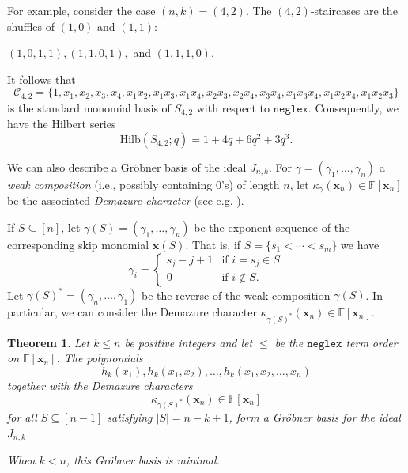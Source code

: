 \documentclass[10pt]{amsart}
\newtheorem{theorem}{Theorem}[section]
\theoremstyle{definition}
\newcommand{\Hilb}{{\mathrm {Hilb}}}
\newcommand{\neglex}{{\mathtt {neglex}}}
\newcommand{\FF}{{\mathbb{F}}}
\newcommand{\CCC}{{\mathcal{C}}}
\newcommand{\xx}{{\mathbf {x}}}
\begin{document}
For example, consider the case $(n,k) = (4,2)$.  The $(4,2)$-staircases are the shuffles of $(1,0)$ and $(1,1)$:
\begin{center}
$(1,0,1,1), (1,1,0,1),$ and $(1,1,1,0)$.
\end{center}
It follows that 
\begin{equation*}
\CCC_{4,2} = \{1, x_1, x_2, x_3, x_4, x_1 x_2, x_1 x_3, x_1 x_4, x_2 x_3, x_2 x_4, x_3 x_4, x_1 x_3 x_4, 
x_1 x_2 x_4, x_1 x_2 x_3 \}
\end{equation*}
is the standard monomial basis of $S_{4,2}$ with respect to $\neglex$.  Consequently, we have the Hilbert series
\begin{equation*}
\Hilb(S_{4,2};q) = 1 + 4q + 6q^2 + 3q^3.
\end{equation*}

We can also describe a Gr\"obner basis of the ideal $J_{n,k}$.
For $\gamma = (\gamma_1, \dots, \gamma_n)$  a \emph{weak composition} (i.e., possibly containing $0$'s)
of length $n$, let $\kappa_{\gamma}(\xx_n) \in \FF[\xx_n]$ be the associated \emph{Demazure character}
(see e.g. \cite[Sec. 2.4]{HRS}).  

If $S \subseteq [n]$, let $\gamma(S) = (\gamma_1, \dots, \gamma_n)$ be the exponent sequence of the corresponding
skip monomial $\xx(S)$.  That is, if $S = \{s_1 < \cdots < s_m\}$ we have
\begin{equation}
\gamma_i = \begin{cases}
s_j - j + 1 & \text{if $i = s_j \in S$} \\
0 & \text{if $i \notin S$}.
\end{cases}
\end{equation}
Let $\gamma(S)^* = (\gamma_n, \dots, \gamma_1)$ be the reverse of the weak composition $\gamma(S)$.
In particular, we can consider the Demazure character $\kappa_{\gamma(S)^*}(\xx_n) \in \FF[\xx_n]$.

\begin{theorem}
\label{groebner-basis}
Let $k \leq n$ be positive integers and
let $\leq$ be the $\neglex$ term order on $\FF[\xx_n]$. The polynomials
\begin{equation*}
h_k(x_1), h_k(x_1, x_2), \dots, h_k(x_1, x_2, \dots, x_n)
\end{equation*}
together with the Demazure characters
\begin{equation*}
\kappa_{\gamma(S)^*}(\xx_n) \in \FF[\xx_n]
\end{equation*}
for all $S \subseteq [n-1]$ satisfying $|S| = n-k+1$, form a Gr\"obner basis for the ideal $J_{n,k}$.

When $k < n$, this Gr\"obner basis is minimal.
\end{theorem}
\end{document}
